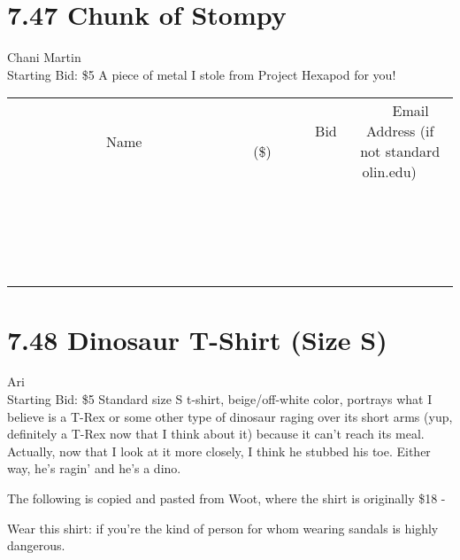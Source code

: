 \documentclass[11pt]{article}
\begin{document}
\section*{7.47 Chunk of Stompy}
Chani Martin
\\
Starting Bid: \$5
\newline
A piece of metal I stole from Project Hexapod for you!
\\[3ex]
\begin{tabular}{c c c}
~~~~~~~~~~~~~Name~~~~~~~~~~~~~ & ~~~~~~~~~Bid (\$)~~~~~~~~~  & ~~~Email Address (if not standard olin.edu)~~~\\
 & & \\
\hline
 & & \\
\hline
 & & \\
\hline
 & & \\
\hline
 & & \\
\hline
 & & \\
\hline
 & & \\
\hline
 & & \\
\hline
 & & \\
\hline
 & & \\
\hline
 & & \\
\hline
 & & \\
\hline
 & & \\
\hline
 & & \\
\hline
 & & \\
\hline
 & & \\
\hline
 & & \\
\hline
 & & \\
\hline
 & & \\
\hline
\end{tabular}
\newpage
\section*{7.48 Dinosaur T-Shirt (Size S)}
Ari
\\
Starting Bid: \$5
\newline
Standard size S t-shirt, beige/off-white color, portrays what I believe is a T-Rex or some other type of dinosaur raging over its short arms (yup, definitely a T-Rex now that I think about it) because it can't reach its meal. Actually, now that I look at it more closely, I think he stubbed his toe. Either way, he's ragin' and he's a dino.

The following is copied and pasted from Woot, where the shirt is originally \$18 -

Wear this shirt: if you're the kind of person for whom wearing sandals is highly dangerous.
\end{document}
